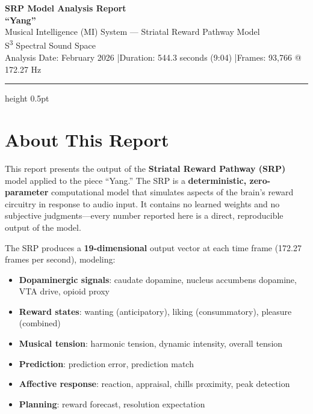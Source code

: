 \documentclass[11pt]{article}
\begin{document}
\begin{center}
{\LARGE\bfseries SRP Model Analysis Report}\\[0.3em]
{\Large\bfseries ``Yang''}\\[1em]
{\large Musical Intelligence (MI) System --- Striatal Reward Pathway Model}\\[0.5em]
{\normalsize S\textsuperscript{3} Spectral Sound Space}\\[1.5em]
{\small Analysis Date: February 2026 \quad|\quad Duration: 544.3 seconds (9:04) \quad|\quad Frames: 93{,}766 @ 172.27 Hz}
\end{center}

\vspace{1em}
\hrule height 0.5pt
\vspace{1em}

\section{About This Report}

This report presents the output of the \textbf{Striatal Reward Pathway (SRP)} model applied to the piece ``Yang.'' The SRP is a \textbf{deterministic, zero-parameter} computational model that simulates aspects of the brain's reward circuitry in response to audio input. It contains no learned weights and no subjective judgments---every number reported here is a direct, reproducible output of the model.

The SRP produces a \textbf{19-dimensional} output vector at each time frame (172.27 frames per second), modeling:
\begin{itemize}
    \item \textbf{Dopaminergic signals}: caudate dopamine, nucleus accumbens dopamine, VTA drive, opioid proxy
    \item \textbf{Reward states}: wanting (anticipatory), liking (consummatory), pleasure (combined)
    \item \textbf{Musical tension}: harmonic tension, dynamic intensity, overall tension
    \item \textbf{Prediction}: prediction error, prediction match
    \item \textbf{Affective response}: reaction, appraisal, chills proximity, peak detection
    \item \textbf{Planning}: reward forecast, resolution expectation
\end{itemize}
\end{document}
